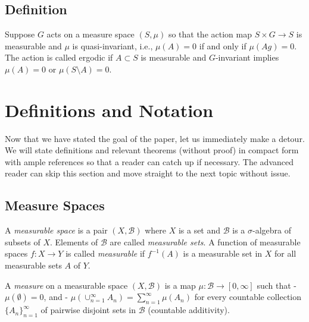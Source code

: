 \documentclass[
  12pt
]{article}
\theoremstyle{break}
\theoremstyle{plain}
\begin{document}
  \hypertarget{definition}{%
  \subsection{Definition}\label{definition}}

  Suppose $G$ acts on a measure space $(S, \mu)$ so that the action
  map $S \times G \rightarrow S$ is measurable and $\mu$ is
  quasi-invariant, i.e., $\mu(A) = 0$ if and only if $\mu(Ag) = 0$.
  The action is called ergodic if $A \subset S$ is measurable and
  $G$-invariant implies $\mu(A) = 0$ or $\mu(S\setminus A) = 0$.




\hypertarget{definitions-and-notation}{%
\section{Definitions and Notation}\label{definitions-and-notation}}


  Now that we have stated the goal of the paper, let us immediately make a
  detour. We will state definitions and relevant theorems (without proof)
  in compact form with ample references so that a reader can catch up if
  necessary. The advanced reader can skip this section and move straight
  to the next topic without issue.




  \hypertarget{measure-spaces}{%
  \subsection{Measure Spaces}\label{measure-spaces}}

  A \emph{measurable space} is a pair $(X, \mathscr{B})$ where $X$ is
  a set and $\mathscr{B}$ is a $\sigma$-algebra of subsets of $X$.
  Elements of $\mathscr{B}$ are called \emph{measurable sets}. A
  function of measurable spaces $f: X \rightarrow Y$ is called
  \emph{measurable} if $f^{-1}(A)$ is a measurable set in $X$ for all
  measurable sets $A$ of $Y$.

  A \emph{measure} on a measurable space $(X, \mathscr{B})$ is a map
  $\mu: \mathscr{B} \rightarrow [0, \infty]$ such that -
  $\mu(\emptyset) = 0$, and -
  $\mu(\cup_{n=1}^{\infty} A_n) = \sum_{n=1}^{\infty} \mu(A_n)$ for
  every countable collection $\{A_n\}_{n=1}^{\infty}$ of pairwise
  disjoint sets in $\mathscr{B}$ (countable additivity).
\end{document}
